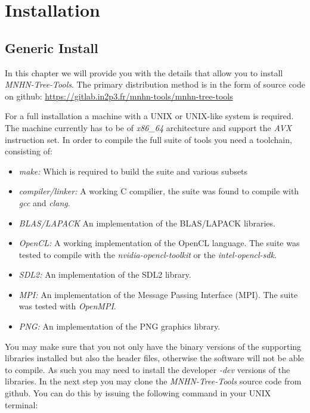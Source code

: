 \chapter{Installation}

\section{Generic Install}

In this chapter we will provide you with the details that allow you to
install \emph{MNHN-Tree-Tools}. The primary distribution method is in the
form of source code on github: \newline
\url{https://gitlab.in2p3.fr/mnhn-tools/mnhn-tree-tools} \newline

For a full installation a machine with a UNIX or UNIX-like system
is required. The machine currently has to be of \emph{x86\_64}
architecture and support the \emph{AVX} instruction set. In order to
compile the full suite of tools you need a toolchain, consisting of:
\begin{itemize}
\item \emph{make:} Which is required to build the suite and various subsets
\item \emph{compiler/linker:} A working C compilier, the suite was found to
  compile with \emph{gcc} and \emph{clang}.
\item \emph{BLAS/LAPACK} An implementation of the BLAS/LAPACK
  libraries.
\item \emph{OpenCL:} A working implementation of the OpenCL
  language. The suite was tested to compile with the
  \emph{nvidia-opencl-toolkit} or the \emph{intel-opencl-sdk}.
\item \emph{SDL2:} An implementation of the SDL2 library.
\item \emph{MPI:} An implementation of the Message Passing Interface
  (MPI). The suite was tested with \emph{OpenMPI}.
\item \emph{PNG:} An implementation of the PNG graphics library.
\end{itemize}
You may make sure that you not only have the binary versions of the
supporting libraries installed but also the header files, otherwise
the software will not be able to compile. As such you may need to
install the developer \emph{-dev} versions of the libraries. In the
next step you may clone the \emph{MNHN-Tree-Tools} source code from github.
You can do this by issuing the following command in your UNIX
terminal:
